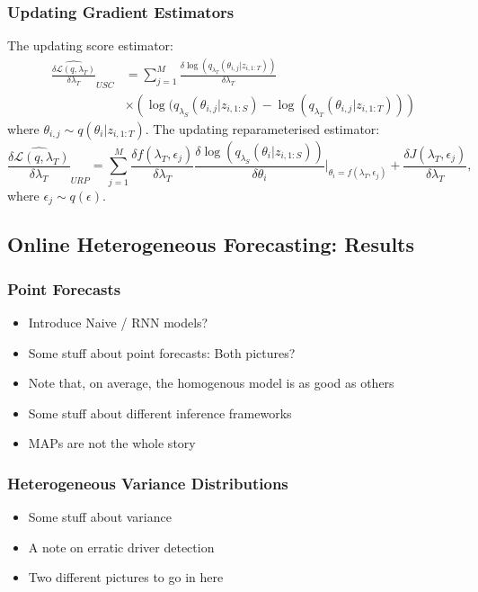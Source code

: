 \documentclass[8pt]{beamer}\usepackage[]{graphicx}\usepackage[]{color}
\begin{document}
\begin{frame}
\frametitle{Updating Gradient Estimators}
The updating score estimator:
\begin{align}
\widehat{\frac{\delta\mathcal{L}(q, \lambda_T)}{\delta \lambda_T}}_{USC} &= \sum_{j = 1}^M \frac{\delta \log(q_{\lambda_T}(\theta_{i, j} | z_{i, 1:T}))}{\delta \lambda_T} \nonumber \\
&\times \left(\log(q_{\lambda_S}(\theta_{i, j} | z_{i, 1:S}) - \log(q_{\lambda_T}(\theta_{i, j} | z_{i, 1:T})) \right) \label{scoreUpdate}
\end{align}
where $\theta_{i, j} \sim q(\theta_{i} | z_{i, 1:T})$. 
The updating reparameterised estimator:
\begin{equation}
\label{rpUpdate}
\widehat{\frac{\delta\mathcal{L}(q, \lambda_T)}{\delta \lambda_T}}_{URP} = \sum_{j = 1}^M \frac{\delta f(\lambda_T, \epsilon_j)}{\delta \lambda_T} \frac{\delta \log(q_{\lambda_S}(\theta_{i} |z_{i, 1:S}))}{\delta \theta_{i}} \bigg\rvert_{\theta_{i} = f(\lambda_T, \epsilon_j)} + \frac{\delta J(\lambda_T, \epsilon_j)}{\delta \lambda_T},
\end{equation}
where $\epsilon_j \sim q(\epsilon)$.
\end{frame}

\begin{frame}
\section{Online Heterogeneous Forecasting: Results}
\frametitle{Point Forecasts}
\begin{itemize}
\item Introduce Naive / RNN models?
\item Some stuff about point forecasts: Both pictures?
\item Note that, on average, the homogenous model is as good as others
\item Some stuff about different inference frameworks
\item MAPs are not the whole story
\end{itemize}
\end{frame}

\begin{frame}
\frametitle{Heterogeneous Variance Distributions}
\begin{itemize}
\item Some stuff about variance
\item A note on erratic driver detection
\item Two different pictures to go in here
\end{itemize}
\end{frame}
\end{document}
